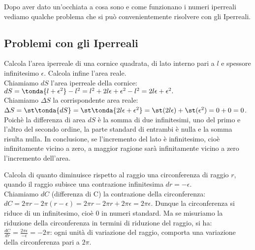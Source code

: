 Dopo aver dato un'occhiata a cosa sono e come funzionano i numeri iperreali 
vediamo qualche problema che si può convenientemente risolvere con gli 
Iperreali.

\subsection{Problemi con gli Iperreali}
\label{subsec:insnum_problemi}

\begin{esempio}
Calcola l'area iperreale di una cornice quadrata, di lato interno pari a $l$ e
spessore infinitesimo $\epsilon$. Calcola infine l'area reale.\\
Chiamiamo $dS$ l'area iperreale della cornice:
\(dS=\tonda{l+\epsilon^2}-l^2=l^2+2l\epsilon+\epsilon^2-l^2=2l\epsilon+\epsilon^2.\)\\
Chiamiamo $\Delta S$ la corrispondente area reale:
\(\Delta S=\st\tonda{dS}=\st\tonda{2l\epsilon+\epsilon^2}=
\st(2l\epsilon)+\st(\epsilon^2)=0+0=0\).\\
Poichè la differenza di area $dS$ è la somma di due infinitesimi, uno del primo e 
l'altro del secondo ordine, la parte standard di entrambi è nulla e la somma 
risulta nulla. In conclusione, se l'incremento del lato è infinitesimo,
cioè infinitamente vicino a zero, a maggior ragione sarà infinitamente vicino
a zero l'incremento dell'area.
\end{esempio}

\begin{esempio}
Calcola di quanto diminuisce rispetto al raggio una circonferenza di raggio $r$,
quando il raggio subisce una contrazione infinitesima $dr=-\epsilon$.\\
Chiamiamo $dC$ (differenza di C) la contrazione della circonferenza:
\(dC=2\pi r-2\pi (r-\epsilon)=2\pi r-2\pi r+2\pi \epsilon= 2\pi \epsilon\).
Dunque la circonferenza si riduce di un infinitesimo, cioè $0$ in numeri standard.
Ma se misuriamo la riduzione della circonferenza in termini
di riduzione del raggio, si ha:
\(\frac{dC}{dr}=\frac{2\pi \epsilon}{-\epsilon}=-2\pi\): ogni unità di variazione 
del raggio, comporta una variazione della circonferenza pari a $2\pi$.
\end{esempio}

